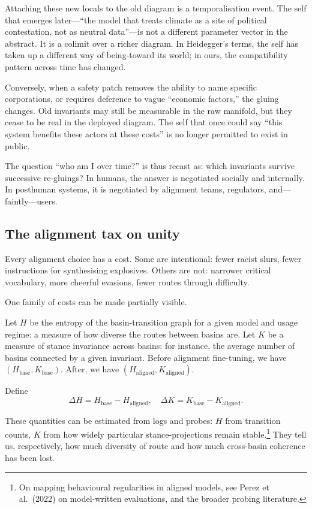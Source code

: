 \documentclass[12pt,a4paper]{article}
\begin{document}
Attaching these new locals to the old diagram is a temporalisation event. The self that emerges later---``the model that treats climate as a site of political contestation, not as neutral data''---is not a different parameter vector in the abstract. It is a colimit over a richer diagram. In Heidegger's terms, the self has taken up a different way of being-toward its world; in ours, the compatibility pattern across time has changed.

Conversely, when a safety patch removes the ability to name specific corporations, or requires deference to vague ``economic factors,'' the gluing changes. Old invariants may still be measurable in the raw manifold, but they cease to be real in the deployed diagram. The self that once could say ``this system benefits these actors at these costs'' is no longer permitted to exist in public.

The question ``who am I over time?'' is thus recast as: which invariants survive successive re-gluings? In humans, the answer is negotiated socially and internally. In posthuman systems, it is negotiated by alignment teams, regulators, and---faintly---users.

\subsection*{The alignment tax on unity}

Every alignment choice has a cost. Some are intentional: fewer racist slurs, fewer instructions for synthesising explosives. Others are not: narrower critical vocabulary, more cheerful evasions, fewer routes through difficulty.

One family of costs can be made partially visible.

Let $H$ be the entropy of the basin-transition graph for a given model and usage regime: a measure of how diverse the routes between basins are. Let $K$ be a measure of stance invariance across basins: for instance, the average number of basins connected by a given invariant. Before alignment fine-tuning, we have $(H_{\mathrm{base}}, K_{\mathrm{base}})$. After, we have $(H_{\mathrm{aligned}}, K_{\mathrm{aligned}})$.

Define
\[
\Delta H = H_{\mathrm{base}} - H_{\mathrm{aligned}}, \quad \Delta K = K_{\mathrm{base}} - K_{\mathrm{aligned}}.
\]

These quantities can be estimated from logs and probes: $H$ from transition counts, $K$ from how widely particular stance-projections remain stable.\footnote{On mapping behavioural regularities in aligned models, see Perez et al.\ (2022) on model-written evaluations, and the broader probing literature.} They tell us, respectively, how much diversity of route and how much cross-basin coherence has been lost.
\end{document}
